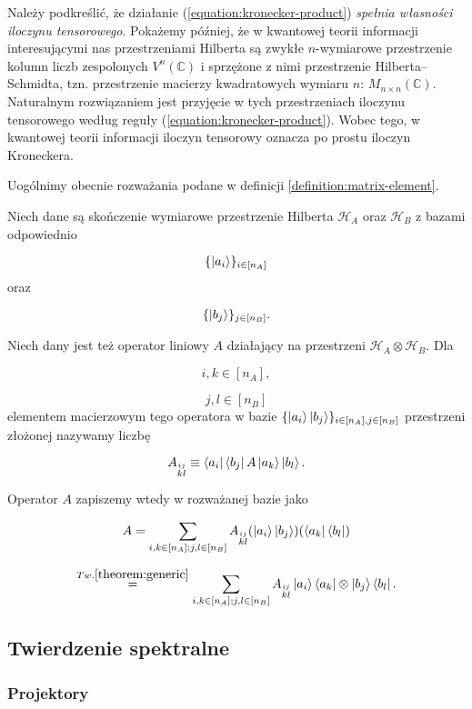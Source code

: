Należy podkreślić, że działanie (\ref{equation:kronecker-product}) \textit{spełnia własności iloczynu tensorowego}. Pokażemy później, że w kwantowej teorii informacji interesującymi nas przestrzeniami Hilberta są zwykłe $n$-wymiarowe przestrzenie kolumn liczb zespolonych $V ^ n (\mathbb{C})$ i sprzężone z nimi przestrzenie Hilberta--Schmidta, tzn. przestrzenie macierzy kwadratowych wymiaru $n$: $M_{n\times n}(\mathbb{C})$. Naturalnym rozwiązaniem jest przyjęcie w tych przestrzeniach iloczynu tensorowego według reguły (\ref{equation:kronecker-product}). Wobec tego, w kwantowej teorii informacji iloczyn tensorowy oznacza po prostu iloczyn Kroneckera.

Uogólnimy obecnie rozważania podane w definicji \ref{definition:matrix-element}.

Niech dane są skończenie wymiarowe przestrzenie Hilberta $\mathcal{H}_{A}$ oraz $\mathcal{H}_{B}$ z bazami odpowiednio

$$
    \{\ket{a_{i}}\}_{i \in [n_{A}]}
$$
oraz

$$
    \{\ket{b_{j}}\}_{j \in [n_{B}]}.
$$

Niech dany jest też operator liniowy $A$ działający na przestrzeni $\mathcal{H}_{A} \otimes \mathcal{H}_{B}$. Dla

$$
    i, k \in [n_{A}],
$$

$$
    j,l \in [n_{B}]
$$
elementem macierzowym tego operatora w bazie $\{\ket{a_{i}} \ket{b_{j}}\}_{i \in [n_{A}], j \in [n_{B}]}$ przestrzeni złożonej nazywamy liczbę

$$
    A_{\stackrel{ij}{kl}} \equiv \bra{a_{i}} \bra{b_{j}} A \ket{a_{k}} \ket{b_{l}}.
$$

Operator $A$ zapiszemy wtedy w rozważanej bazie jako

$$
    A = \sum\limits_{i, k \in [n_{A}]; j, l \in [n_{B}]} A_{\stackrel{ij}{kl}} (\ket{a_{i}} \ket{b_{j}}) (\bra{a_{k}} \bra{b_{l}})
$$

\begin{equation}
    \label{equation:elements}
    \stackrel{Tw. \ref{theorem:generic}}{=} \sum\limits_{i, k \in [n_{A}]; j, l \in [n_{B}]} A_{\stackrel{ij}{kl}} \ket{a_{i}} \bra{a_{k}} \otimes \ket{b_{j}} \bra{b_{l}}.
\end{equation}

\subsection{Twierdzenie spektralne}

\subsubsection{Projektory}


